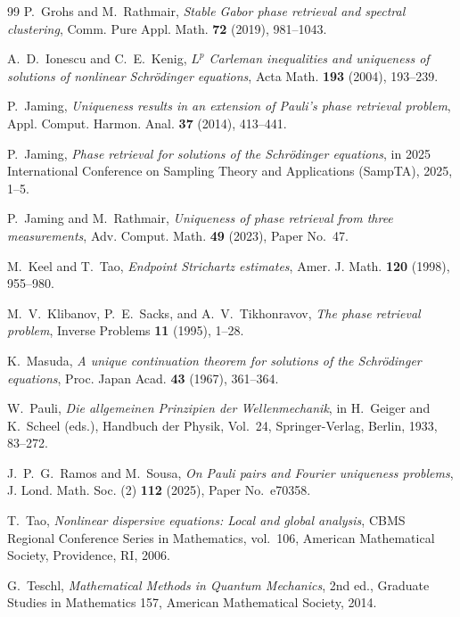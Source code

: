 \documentclass[11pt]{amsart}
\theoremstyle{remark}
\newcommand{\1}{\mathbf 1}
\begin{document}
\begin{thebibliography}{99}
P.~Grohs and M.~Rathmair,
\emph{Stable Gabor phase retrieval and spectral clustering},
Comm. Pure Appl. Math. \textbf{72} (2019), 981--1043.

A.~D.~Ionescu and C.~E.~Kenig,
\emph{$L^p$ Carleman inequalities and uniqueness of solutions of nonlinear
Schr\"odinger equations},
Acta Math. \textbf{193} (2004), 193--239.

P.~Jaming,
\emph{Uniqueness results in an extension of Pauli's phase retrieval problem},
Appl. Comput. Harmon. Anal. \textbf{37} (2014), 413--441.

P.~Jaming,
\emph{Phase retrieval for solutions of the Schr\"odinger equations},
in 2025 International Conference on Sampling Theory and Applications
(SampTA), 2025, 1--5.

P.~Jaming and M.~Rathmair,
\emph{Uniqueness of phase retrieval from three measurements},
Adv. Comput. Math. \textbf{49} (2023), Paper No.~47.

M.~Keel and T.~Tao,
\emph{Endpoint Strichartz estimates},
Amer. J. Math. \textbf{120} (1998), 955--980.

M.~V.~Klibanov, P.~E.~Sacks, and A.~V.~Tikhonravov,
\emph{The phase retrieval problem},
Inverse Problems \textbf{11} (1995), 1--28.

K.~Masuda,
\emph{A unique continuation theorem for solutions of the Schr\"odinger
equations},
Proc. Japan Acad. \textbf{43} (1967), 361--364.


W.~Pauli,
\emph{Die allgemeinen Prinzipien der Wellenmechanik},
in H.~Geiger and K.~Scheel (eds.), Handbuch der Physik, Vol.~24,
Springer-Verlag, Berlin, 1933, 83--272.

J.~P.~G.~Ramos and M.~Sousa,
\emph{On Pauli pairs and Fourier uniqueness problems},
J. Lond. Math. Soc. (2) \textbf{112} (2025), Paper No.~e70358.

T.~Tao,
\emph{Nonlinear dispersive equations: Local and global analysis},
CBMS Regional Conference Series in Mathematics, vol.~106,
American Mathematical Society, Providence, RI, 2006.

G.~Teschl,
\emph{Mathematical Methods in Quantum Mechanics},
2nd ed., Graduate Studies in Mathematics 157,
American Mathematical Society, 2014.


\end{thebibliography}
\end{document}
